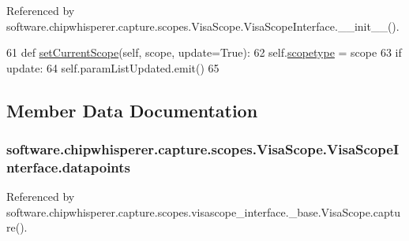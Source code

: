 Referenced by software.\+chipwhisperer.\+capture.\+scopes.\+Visa\+Scope.\+Visa\+Scope\+Interface.\+\_\+\+\_\+init\+\_\+\+\_\+().


\begin{DoxyCode}
61     \textcolor{keyword}{def }\hyperlink{classsoftware_1_1chipwhisperer_1_1capture_1_1scopes_1_1VisaScope_1_1VisaScopeInterface_aa2dc3dac7e05afc998a49fbf865b71f7}{setCurrentScope}(self, scope, update=True):
62         self.\hyperlink{classsoftware_1_1chipwhisperer_1_1capture_1_1scopes_1_1VisaScope_1_1VisaScopeInterface_aece91f171885b082ccbfe991b42ee053}{scopetype} = scope
63         \textcolor{keywordflow}{if} update:
64             self.paramListUpdated.emit()
65 
\end{DoxyCode}


\subsection{Member Data Documentation}
\hypertarget{classsoftware_1_1chipwhisperer_1_1capture_1_1scopes_1_1VisaScope_1_1VisaScopeInterface_ac4207839ddc47e180ef8a7de065cbe57}{}
\subsubsection[{datapoints}]{\setlength{\rightskip}{0pt plus 5cm}software.\+chipwhisperer.\+capture.\+scopes.\+Visa\+Scope.\+Visa\+Scope\+Interface.\+datapoints}\label{classsoftware_1_1chipwhisperer_1_1capture_1_1scopes_1_1VisaScope_1_1VisaScopeInterface_ac4207839ddc47e180ef8a7de065cbe57}


Referenced by software.\+chipwhisperer.\+capture.\+scopes.\+visascope\+\_\+interface.\+\_\+base.\+Visa\+Scope.\+capture().

\hypertarget{classsoftware_1_1chipwhisperer_1_1capture_1_1scopes_1_1VisaScope_1_1VisaScopeInterface_a9177aa778506d585aea4a57ea3fd8896}{}
